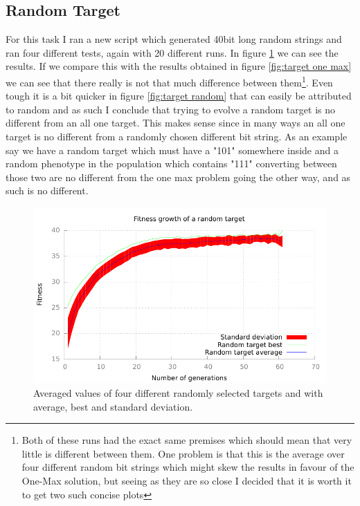 \subsection{Random Target}\label{sec:random target}
For this task I ran a new script which generated 40bit long random strings and
ran four different tests, again with 20 different runs. In figure
\ref{fig:random target} we can see the results. If we compare this with the
results obtained in figure \ref{fig:target one max} we can see that there really is
not that much difference between them\footnote{Both of these runs had the exact
	same premises which should mean that very little is different between
	them. One problem is that this is the average over four different random
	bit strings which might skew the results in favour of the One-Max
	solution, but seeing as they are so close I decided that it is worth it
to get two such concise plots}. Even tough it is a bit quicker in figure
\ref{fig:target random} that can easily be attributed to random and as such I
conclude that trying to evolve a random target is no different from an all one
target. This makes sense since in many ways an all one target is no different
from a randomly chosen different bit string. As an example say we have a random
target which must have a "101" somewhere inside and a random phenotype in the
population which contains "111" converting between those two are no different from the
one max problem going the other way, and as such is no different.

\begin{figure}[h!]
	\includegraphics{../graphs/fitness_target_random.pdf}
	\caption{Averaged values of four different randomly selected targets and
	with average, best and standard deviation.}
	\label{fig:random target}
\end{figure}

